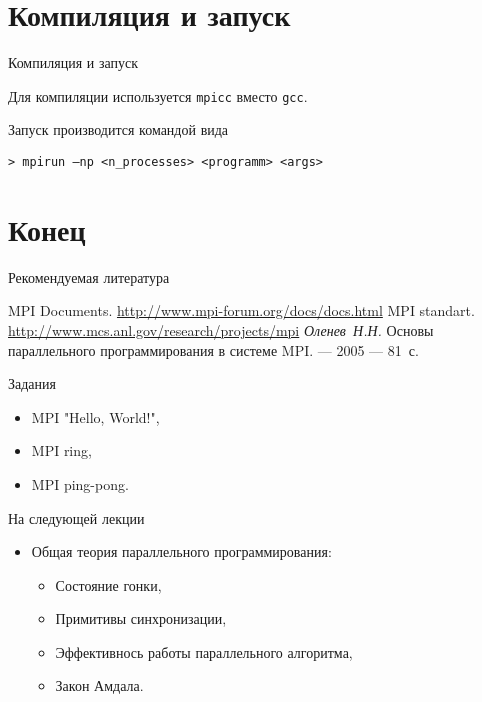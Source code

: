 \section{Компиляция и запуск}

\begin{frame}[fragile]{Компиляция и запуск}

Для компиляции используется \texttt{mpicc} вместо \texttt{gcc}.

\vfill

Запуск производится командой вида

\begin{lstlisting}
> mpirun –np <n_processes> <programm> <args>
\end{lstlisting}

\end{frame}

\section*{Конец}

\begin{frame}[allowframebreaks]{Рекомендуемая литература}
\begin{thebibliography}{99}
    \bibitem{} MPI Documents. \url{http://www.mpi-forum.org/docs/docs.html}
    \bibitem{} MPI standart. \url{http://www.mcs.anl.gov/research/projects/mpi}
    \bibitem{} \textit{Оленев~Н.Н.} Основы параллельного программирования в
    системе MPI. --- 2005 --- 81~с.
\end{thebibliography}
\end{frame}

\begin{frame}{Задания}

\begin{itemize}
    \item MPI "Hello, World!",
    \item MPI ring,
    \item MPI ping-pong.
\end{itemize}

\end{frame}

\begin{frame}{На следующей лекции}

\begin{itemize}
    \item Общая теория параллельного программирования:
    \begin{itemize}
        \item Состояние гонки,
        \item Примитивы синхронизации,
        \item Эффективнось работы параллельного алгоритма,
        \item Закон Амдала.
    \end{itemize}
\end{itemize}

\end{frame}

